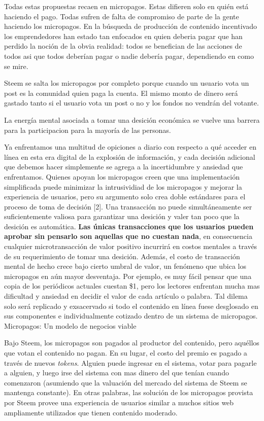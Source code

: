 \documentclass[a4paper,titlepage,final]{article}
\begin{document}
Todas estas propuestas recaen en micropagos. Estas difieren solo en quién está haciendo el pago. Todas sufren de falta de compromiso de parte de la gente haciendo los micropagos. En la búsqueda de producción de contenido incentivado los emprendedores han estado tan enfocados en quien deberia pagar que han perdido la noción de la obvia realidad: todos se benefician de las acciones de todos asi que todos deberían pagar o nadie debería pagar, dependiendo en como se mire.

Steem se salta los micropagos por completo porque cuando un usuario vota un post es la comunidad quien paga la cuenta. El mismo monto de dinero será gastado tanto si el usuario vota un post o no y los fondos no vendrán del votante.

La energía mental asociada a tomar una desición económica se vuelve una barrera para la participacion para la mayoría de las personas.

\begin{displayquote}
Ya enfrentamos una multitud de opiciones a diario con respecto a qué acceder en línea en esta era digital de la explosión de información, y cada decisión adicional que debemos hacer simplemente se agrega a la incertidumbre y ansiedad que enfrentamos. Quienes apoyan los micropagos creen que una implementación simplificada puede minimizar la intrusividiad de los micropagos y mejorar la experiencia de usuarios, pero su argumento solo crea doble estándares para el proceso de toma de decisión [2]. Una transacción no puede simultáneamente ser suficientemente valiosa para garantizar una desición y valer tan poco que la desición es automática. \textbf{Las únicas transacciones que los usuarios pueden aprobar sin pensarlo son aquellas que no cuestan nada}, en consecuencia cualquier microtransacción de valor positivo incurrirá en costos mentales a través de su requerimiento de tomar una desición. Además, el costo de transacción mental de hecho crece bajo cierto umbral de valor, un fenómeno que ubica los micropagos en aún mayor desventaja. Por ejemplo, es muy fácil pensar que una copia de los periódicos actuales cuestan \$1, pero los lectores enfrentan mucha mas dificultad y ansiedad en decidir el valor de cada artículo o palabra. Tal dilema solo será replicado y exsacervado si todo el contenido en línea fuese desglosado en sus componentes e individualmente cotizado dentro de un sistema de micropagos.
Micropagos: Un modelo de negocios viable \cite{23}
\end{displayquote}

Bajo Steem, los micropagos son pagados al productor del contenido, pero aquéllos que votan el contenido no pagan. En su lugar, el costo del premio es pagado a través de nuevos \textit{tokens}. Alguien puede ingresar en el sistema, votar para pagarle a alguien, y luego irse del sistema con mas dinero del que tenían cuando comenzaron (asumiendo que la valuación del mercado del sistema de Steem se mantenga constante). En otras palabras, las solución de los micropagos provista por Steem provee una experiencia de usuarios similar a muchos sitios web ampliamente utilizados que tienen contenido moderado.
\end{document}
